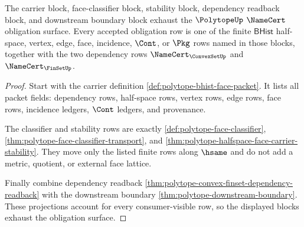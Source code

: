 \begin{theorem}
\label{thm:polytope-obligation-boundary-exhaustion}
The carrier block, face-classifier block, stability block, dependency readback
block, and downstream boundary block exhaust the $\PolytopeUp$
$\NameCert$ obligation surface. Every accepted obligation row is one of the
finite $\mathsf{BHist}$ half-space, vertex, edge, face, incidence, $\Cont$, or
$\Pkg$ rows named in those blocks, together with the two dependency rows
$\NameCert_{\ConvexSetUp}$ and $\NameCert_{\FinSetUp}$.
\end{theorem}
\begin{proof}
Start with the carrier definition
\autoref{def:polytope-bhist-face-packet}. It lists all packet fields:
dependency rows, half-space rows, vertex rows, edge rows, face rows,
incidence ledgers, $\Cont$ ledgers, and provenance.

The classifier and stability rows are exactly
\autoref{def:polytope-face-classifier},
\autoref{thm:polytope-face-classifier-transport}, and
\autoref{thm:polytope-halfspace-face-carrier-stability}. They move only the
listed finite rows along $\hsame$ and do not add a metric, quotient, or
external face lattice.

Finally combine dependency readback
\autoref{thm:polytope-convex-finset-dependency-readback} with the downstream
boundary \autoref{thm:polytope-downstream-boundary}. These projections account
for every consumer-visible row, so the displayed blocks exhaust the obligation
surface.
\end{proof}


